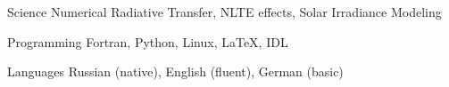 

\begin{cvskills}

  \cvskill
    {Science} %
    {Numerical Radiative Transfer, NLTE effects, Solar Irradiance Modeling} %

  \cvskill
    {Programming} %
    {Fortran, Python, Linux, LaTeX, IDL} %

  \cvskill
    {Languages} %
    {Russian (native), English (fluent), German (basic)} %

\end{cvskills}
